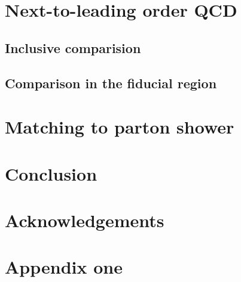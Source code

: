 \documentclass[twocolumn,epjc3]{svjour3} %
\begin{document}




\section{Next-to-leading order QCD}
\label{sec:NLO}

\subsection{Inclusive comparision}
\label{subsec:NLOinclusive}



\subsection{Comparison in the fiducial region}






\section{Matching to parton shower}
\label{sec:matching}



\section{Conclusion}
\label{sec:conclusion}




\section*{Acknowledgements}



\appendix

\section{Appendix one}




\end{document}
